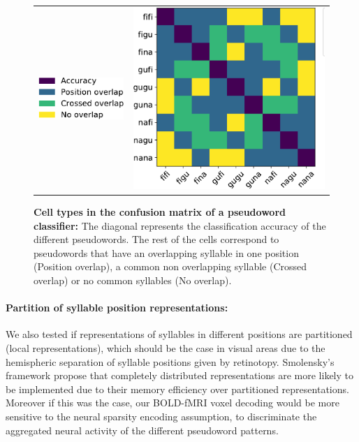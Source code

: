 \begin{figure}[ht]
\scriptsize
\hspace{-4ex}
\begin{tabular}{cl}
{\includegraphics[width=0.3\linewidth]{figures/part_II/super_matrix_legend.pdf}}
\hspace{-1ex}
&{\includegraphics[width=0.6\linewidth]{figures/part_II/super_matrix.pdf}}
\hspace{-1ex}\\
\end{tabular}
\caption{\textbf{Cell types in the confusion matrix of a pseudoword classifier:}
The diagonal represents the classification accuracy of the different pseudowords. The rest of the cells correspond to pseudowords that have an overlapping syllable in one position (Position overlap), a common non overlapping syllable (Crossed overlap) or no common syllables (No overlap).}
\label{fig:super_confusion}
\end{figure}


\paragraph{Partition of syllable position representations:}
We also tested if representations of syllables in different positions are partitioned (local representations), which should be the case in visual areas due to the hemispheric separation of syllable positions given by retinotopy.
Smolensky's framework propose that completely distributed representations are more likely to be implemented due to their memory efficiency over partitioned representations.
Moreover if this was the case, our BOLD-fMRI voxel decoding would be more sensitive to the neural sparsity encoding assumption, to discriminate the aggregated neural activity of the different pseudoword patterns.

